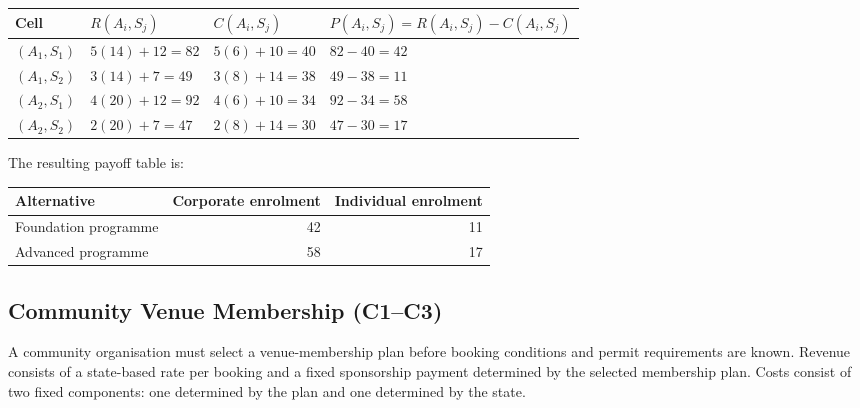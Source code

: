 \begin{center}
	\small
	\begin{tabular}{llll}
		\toprule
		Cell
		& \(R(A_i,S_j)\)
		& \(C(A_i,S_j)\)
		& \(P(A_i,S_j)=R(A_i,S_j)-C(A_i,S_j)\) \\
		\midrule
		\((A_1,S_1)\)
		& \(5(14)+12=82\)
		& \(5(6)+10=40\)
		& \(82-40=42\) \\
		
		\((A_1,S_2)\)
		& \(3(14)+7=49\)
		& \(3(8)+14=38\)
		& \(49-38=11\) \\
		
		\((A_2,S_1)\)
		& \(4(20)+12=92\)
		& \(4(6)+10=34\)
		& \(92-34=58\) \\
		
		\((A_2,S_2)\)
		& \(2(20)+7=47\)
		& \(2(8)+14=30\)
		& \(47-30=17\) \\
		\bottomrule
	\end{tabular}
\end{center}

The resulting payoff table is:

\begin{center}
	\begin{tabular}{lrr}
		\toprule
		Alternative & Corporate enrolment & Individual enrolment \\
		\midrule
		Foundation programme & 42 & 11 \\
		Advanced programme & 58 & 17 \\
		\bottomrule
	\end{tabular}
\end{center}


\subsection{Community Venue Membership (C1--C3)}
\label{sec:problem12-community-venue-membership-c1-c3}

A community organisation must select a venue-membership plan before booking
conditions and permit requirements are known. Revenue consists of a
state-based rate per booking and a fixed sponsorship payment determined by
the selected membership plan. Costs consist of two fixed components: one
determined by the plan and one determined by the state.

